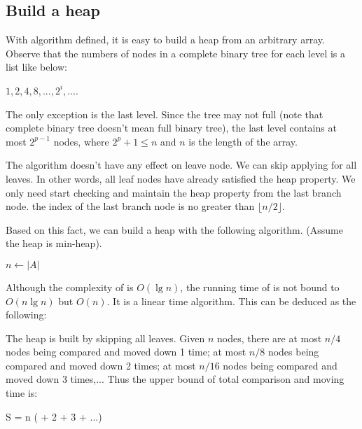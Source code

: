 \documentclass{article}
\begin{document}
\subsection{Build a heap}

With  algorithm defined, it is easy to build a heap from an arbitrary
array. Observe that the numbers of nodes in a complete binary tree
for each level is a list like below:

$1, 2, 4, 8, ..., 2^i, ...$.

The only exception is the last level. Since the tree may not full
(note that complete binary tree doesn't mean full binary tree), the
last level contains at most $2^{p-1}$ nodes, where $2^p + 1 \leq n$ and $n$
is the length of the array.

The  algorithm doesn't have any effect on leave node.
We can skip applying  for all leaves. In other words,
all leaf nodes have already satisfied the heap property. We only need
start checking and maintain the heap property from the last branch node.
the index of the last branch node is no greater than $\lfloor n/2 \rfloor$.

Based on this fact, we can build a heap with the following algorithm.
(Assume the heap is min-heap).

\begin{algorithmic}[1]
  \State $n \gets |A|$
    \State {}
  \EndFor
\EndFunction
\end{algorithmic}

Although the complexity of  is $O(\lg n)$, the running time
of  is not bound to $O(n \lg n)$ but $O(n)$. It
is a linear time algorithm. This can be deduced as the following:

The heap is built by skipping all leaves.
Given $n$ nodes, there are at most $n/4$ nodes being compared and moved down 1 time;
at most $n/8$ nodes being compared and moved down 2 times; at most $n/16$ nodes being
compared and moved down 3 times,... Thus the upper bound of total comparison and
moving time is:

\be
S = n ( + 2  + 3  + ...)
\label{eq:build-heap-1}
\ee
\end{document}
